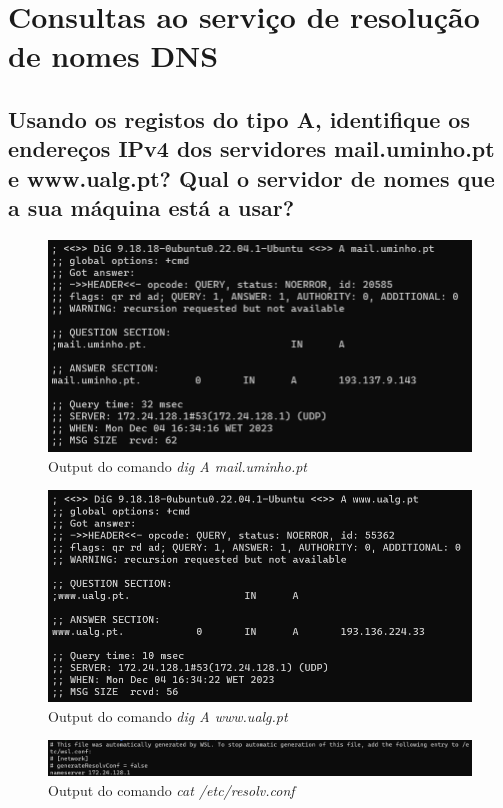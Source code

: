 \section{Consultas ao serviço de resolução de nomes DNS}

\subsection{Usando os registos do tipo A, identifique os endereços IPv4 dos servidores mail.uminho.pt e
www.ualg.pt? Qual o servidor de nomes que a sua máquina está a usar?}

\begin{figure}[h!]
    \centering
    \includegraphics[width=1\textwidth]{images/ex1.mail.png}
    \caption{\label{fig:comando}Output do comando \textit{dig A mail.uminho.pt}}
\end{figure}

\begin{figure} [h!]
    \centering
    \includegraphics[width=1\textwidth]{images/ex1.ualg.png}
    \caption{\label{fig:comando1}Output do comando \textit{dig A www.ualg.pt}}
\end{figure}

\begin{figure} [h!]
    \centering
    \includegraphics[width=1\textwidth]{images/ex1.resolv.png}
    \caption{\label{fig:comando2}Output do comando \textit{cat /etc/resolv.conf}}
\end{figure}


